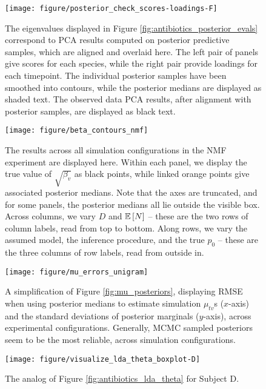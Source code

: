 \documentclass[oupdraft]{bio}
\begin{document}
\begin{figure}[!p]
  \centering
  \texttt{[image: figure/posterior\_check\_scores-loadings-F]}
  \caption{The eigenvalues displayed in Figure
    \ref{fig:antibiotics_posterior_evals} correspond to PCA results computed on
    posterior predictive samples, which are aligned and overlaid here. The left
    pair of panels give scores for each species, while the right pair provide
    loadings for each timepoint. The individual posterior samples have been
    smoothed into contours, while the posterior medians are displayed as shaded
    text. The observed data PCA results, after alignment with posterior samples,
    are displayed as black text. \label{fig:antibiotics_posterior_pca} }
\end{figure}

\begin{figure}[!p]
  \centering
  \texttt{[image: figure/beta\_contours\_nmf]}
  \caption{The results across all simulation configurations in the NMF
    experiment are displayed here. Within each panel, we display the true value
    of $\sqrt{\beta_{v}}$ as black points, while linked orange points give
    associated posterior medians. Note that the axes are truncated, and for some
    panels, the posterior medians all lie outside the visible box. Across
    columns, we vary $D$ and $\mathbb{E}\left[{N}\right]$ -- these are the two rows of column
    labels, read from top to bottom. Along rows, we vary the assumed model, the
    inference procedure, and the true $p_{0}$ -- these are the three columns of
    row labels, read from outside in.\label{fig:beta_contours_nmf}}
\end{figure}

\begin{figure}[ht]
  \centering
  \texttt{[image: figure/mu\_errors\_unigram]}
  \caption{A simplification of Figure \ref{fig:mu_posteriors}, displaying RMSE when
    using posterior medians to estimate simulation $\mu_{tv}$s ($x$-axis) and
    the standard deviations of posterior marginals ($y$-axis), across
    experimental configurations. Generally, MCMC sampled posteriors seem to be
    the most reliable, across simulation configurations.
    \label{fig:mu_errors_unigram}
  }
\end{figure}


\begin{figure}[!p]
  \centering\texttt{[image: figure/visualize\_lda\_theta\_boxplot-D]}
  \caption{The analog of Figure \ref{fig:antibiotics_lda_theta} for Subject
    D. \label{fig:antibiotics_lda_theta_D}}
\end{figure}
\end{document}
